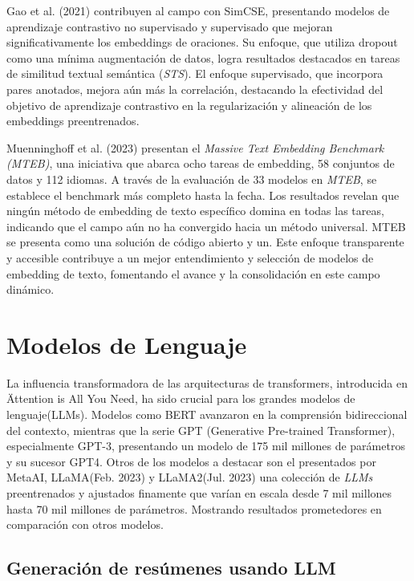     Gao et al. (2021)\cite{gao2022simcse} contribuyen al campo con SimCSE, presentando modelos de aprendizaje contrastivo no supervisado y supervisado que mejoran significativamente los embeddings de oraciones. Su enfoque, que utiliza dropout como una mínima augmentación de datos, logra resultados destacados en tareas de similitud textual semántica (\emph{STS}). El enfoque supervisado, que incorpora pares anotados, mejora aún más la correlación, destacando la efectividad del objetivo de aprendizaje contrastivo en la regularización y alineación de los embeddings preentrenados.

    Muenninghoff et al. (2023)\cite{muennighoff2023mteb} presentan el \emph{Massive Text Embedding Benchmark (MTEB)}, una iniciativa que abarca ocho tareas de embedding, 58 conjuntos de datos y 112 idiomas. A través de la evaluación de 33 modelos en \emph{MTEB}, se establece el benchmark más completo hasta la fecha. Los resultados revelan que ningún método de embedding de texto específico domina en todas las tareas, indicando que el campo aún no ha convergido hacia un método universal. MTEB se presenta como una solución de código abierto y un\cite[leaderboard público]{leaderboard}. Este enfoque transparente y accesible contribuye a un mejor entendimiento y selección de modelos de embedding de texto, fomentando el avance y la consolidación en este campo dinámico.

\section{Modelos de Lenguaje}
   
    La influencia transformadora de las arquitecturas de transformers, introducida en \"Attention is All You Need\" \cite{attention}, ha sido crucial para los grandes modelos de lenguaje(LLMs). Modelos como BERT\cite{BERT} avanzaron en la comprensión bidireccional del contexto, mientras que la serie GPT (Generative Pre-trained Transformer), especialmente GPT-3\cite{brown2020language}, presentando un modelo de 175 mil millones de parámetros y su sucesor GPT4\cite{openai2023gpt4}. Otros de los modelos a destacar son el presentados por MetaAI, LLaMA(Feb. 2023)\cite{llamapaper} y LLaMA2(Jul. 2023)\cite{llamapaper2} una colección de \emph{LLMs} preentrenados y ajustados finamente que varían en escala desde 7 mil millones hasta 70 mil millones de parámetros. Mostrando resultados prometedores en comparación con otros modelos\cite{metallama}. 
    
    \subsection{Generación de resúmenes usando LLM}

